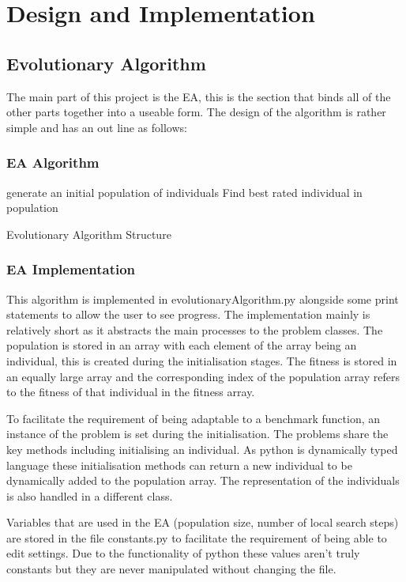 \documentclass[a4paper]{article}
\begin{document}
\section{Design and Implementation}
\par
\subsection{Evolutionary Algorithm}
\par
The main part of this project is the EA, this is the section that binds all of the other parts together into a useable form.
The design of the algorithm is rather simple and has an out line as follows:
\subsubsection{EA Algorithm}
\begin{algorithm}[H]
\SetAlgoLined{}
generate an initial population of individuals\;
Find best rated individual in population\;
\caption{Evolutionary Algorithm Structure}
\end{algorithm}
\subsubsection{EA Implementation}
\par
This algorithm is implemented in evolutionaryAlgorithm.py alongside some print statements to allow the user to see progress.
The implementation mainly is relatively short as it abstracts the main processes to the problem classes.
The population is stored in an array with each element of the array being an individual, this is created during the initialisation stages.
The fitness is stored in an equally large array and the corresponding index of the population array refers to the fitness of that individual in the fitness array.
\par
To facilitate the requirement of being adaptable to a benchmark function, an instance of the problem is set during the initialisation.
The problems share the key methods including initialising an individual.
As python is dynamically typed language these initialisation methods can return a new individual to be dynamically added to the population array.
The representation of the individuals is also handled in a different class.
\par
Variables that are used in the EA (population size, number of local search steps) are stored in the file constants.py to facilitate the requirement of being able to edit settings.
Due to the functionality of python these values aren't truly constants but they are never manipulated without changing the file.
\end{document}
